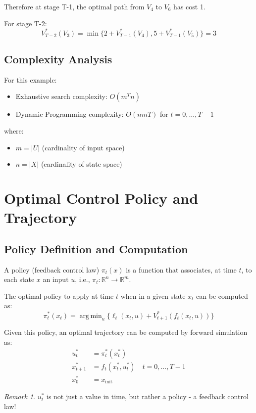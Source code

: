 \documentclass[openany]{book}
\DeclareMathOperator*{\argmin}{arg\,min}  %
\newcommand{\R}{\mathbb{R}}               %
\theoremstyle{definition}
\theoremstyle{remark}
\newtheorem*{remark}{Remark}
\begin{document}
Therefore at stage T-1, the optimal path from $V_4$ to $V_6$ has cost 1.

For stage T-2:
\[
    V_{T-2}^*(V_3) = \min\{2+V_{T-1}^*(V_4), 5+V_{T-1}^*(V_5)\} = 3
\]

\subsection{Complexity Analysis}
For this example:
\begin{itemize}
    \item Exhaustive search complexity: $O(m^T n)$
    \item Dynamic Programming complexity: $O(nmT)$ for $t=0,\dots,T-1$
\end{itemize}
where:
\begin{itemize}
    \item $m = |U|$ (cardinality of input space)
    \item $n = |X|$ (cardinality of state space)
\end{itemize}

\section{Optimal Control Policy and Trajectory}

\subsection{Policy Definition and Computation}
A policy (feedback control law) $\pi_t(x)$ is a function that associates, at time $t$, to each state $x$ an input $u$, i.e., $\pi_t: \R^n \to \R^m$.

The optimal policy to apply at time $t$ when in a given state $x_t$ can be computed as:
\[
    \pi_t^*(x_t) = \argmin_u \{\ell_t(x_t,u) + V_{t+1}^*(f_t(x_t,u))\}
\]

Given this policy, an optimal trajectory can be computed by forward simulation as:
\begin{align*}
    u_t^* &= \pi_t^*(x_t^*) \\
    x_{t+1}^* &= f_t(x_t^*, u_t^*) \quad t = 0,\ldots,T-1 \\
    x_0^* &= x_{\text{init}}
\end{align*}

\begin{remark}
$u_t^*$ is not just a value in time, but rather a policy - a feedback control law!
\end{remark}
\end{document}
